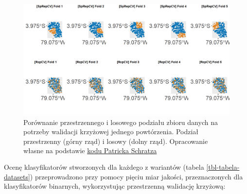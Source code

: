 \documentclass{amuthesis}
\begin{document}
\begin{figure}[t]

{\centering \includegraphics[width=1\textwidth,height=\textheight]{figures/spcv_plot.png}

}

\caption{\label{fig-rycina-spcv}Porównanie przestrzennego i losowego
podziału zbioru danych na potrzeby walidacji krzyżowej jednego
powtórzenia. Podział przestrzenny (górny rząd) i losowy (dolny rząd).
Opracowanie własne na podstawie
\href{https://mlr.mlr-org.com/articles/tutorial/handling_of_spatial_data.html}{kodu
Patricka Schratza}}

\end{figure}

Ocenę klasyfikatorów stworzonych dla każdego z wariantów (tabela
\ref{tbl-tabela-datasets}) przeprowadzono przy pomocy pięciu miar
jakości, przeznaczonych dla klasyfikatorów binarnych, wykorzystując
przestrzenną walidację krzyżową:
\end{document}
